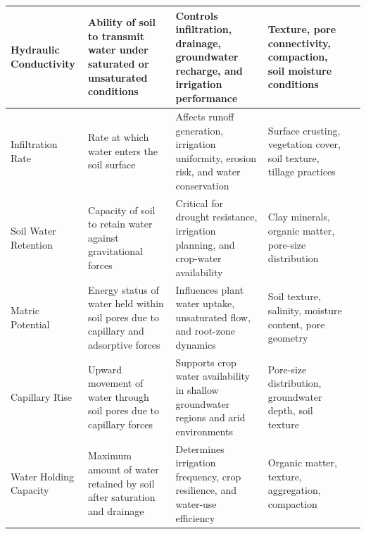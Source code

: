 \documentclass[land,article,submit,pdftex,moreauthors]{Definitions/mdpi}
\numberwithin{equation}{section}
\begin{document}
\begin{longtable}{@{\extracolsep{\fill}} p{} p{} p{} p{} p{} @{}}
Hydraulic Conductivity &
Ability of soil to transmit water under saturated or unsaturated conditions &
Controls infiltration, drainage, groundwater recharge, and irrigation performance &
Texture, pore connectivity, compaction, soil moisture conditions &
\citep{MDPIHydraul2025, Mualem1976, VanGenuchten1980} \\ \hline

Infiltration Rate &
Rate at which water enters the soil surface &
Affects runoff generation, irrigation uniformity, erosion risk, and water conservation &
Surface crusting, vegetation cover, soil texture, tillage practices &
\citep{Assouline2011, Philip1957, Green1911, Morbidelli2018} \\ \hline

Soil Water Retention &
Capacity of soil to retain water against gravitational forces &
Critical for drought resistance, irrigation planning, and crop-water availability &
Clay minerals, organic matter, pore-size distribution &
\citep{Gamagedara2025, VanGenuchten1980, Hodnett2002, Vereecken1989} \\ \hline

Matric Potential &
Energy status of water held within soil pores due to capillary and adsorptive forces &
Influences plant water uptake, unsaturated flow, and root-zone dynamics &
Soil texture, salinity, moisture content, pore geometry &
\citep{Gamagedara2025, Richards1931, Dane2002} \\ \hline

Capillary Rise &
Upward movement of water through soil pores due to capillary forces &
Supports crop water availability in shallow groundwater regions and arid environments &
Pore-size distribution, groundwater depth, soil texture &
\citep{MDPIHydraul2025, Gardner1958, Liu2022} \\ \hline

Water Holding Capacity &
Maximum amount of water retained by soil after saturation and drainage &
Determines irrigation frequency, crop resilience, and water-use efficiency &
Organic matter, texture, aggregation, compaction &
\citep{Barik2020, Minasny2016, Hudson1994, Rawls2003} \\

\end{longtable}
\normalsize
\end{document}
